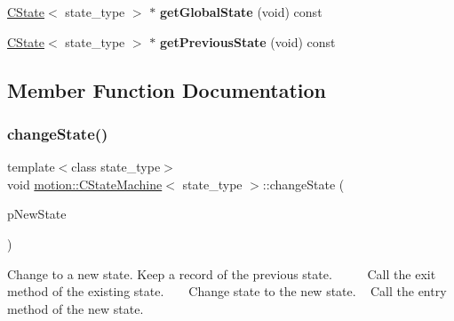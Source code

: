 \begin{DoxyCompactItemize}
\item 
\mbox{\label{classmotion_1_1CStateMachine_ac9e635be4cb960479c6cdef54966480b}} 
\mbox{\hyperlink{classmotion_1_1CState}{C\+State}}$<$ state\+\_\+type $>$ $\ast$ {\bfseries get\+Global\+State} (void) const
\item 
\mbox{\label{classmotion_1_1CStateMachine_acab2aefef8b1fa57d211eb68aa8e96f8}} 
\mbox{\hyperlink{classmotion_1_1CState}{C\+State}}$<$ state\+\_\+type $>$ $\ast$ {\bfseries get\+Previous\+State} (void) const
\end{DoxyCompactItemize}


\subsection{Member Function Documentation}
\mbox{\label{classmotion_1_1CStateMachine_a13d97b778f850709c7f9060de4aba142}} 
\subsubsection{\texorpdfstring{change\+State()}{changeState()}}
{\footnotesize\ttfamily template$<$class state\+\_\+type$>$ \\
void \mbox{\hyperlink{classmotion_1_1CStateMachine}{motion\+::\+C\+State\+Machine}}$<$ state\+\_\+type $>$\+::change\+State (\begin{DoxyParamCaption}\item[{\mbox{\hyperlink{classmotion_1_1CState}{C\+State}}$<$ state\+\_\+type $>$ $\ast$}]{p\+New\+State }\end{DoxyParamCaption})\hspace{0.3cm}{\ttfamily [inline]}}

Change to a new state. Keep a record of the previous state. ~\newline
~\newline
~\newline
 Call the exit method of the existing state. ~\newline
~\newline
 Change state to the new state. ~\newline
 Call the entry method of the new state. \mbox{\label{classmotion_1_1CStateMachine_a2231e1232b1fe6a793b95e0e2217f362}} 

